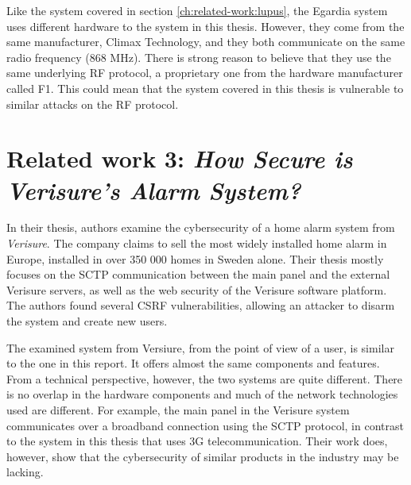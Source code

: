 Like the system covered in section \ref{ch:related-work:lupus}, the Egardia system uses different hardware to the system in this thesis. However, they come from the same manufacturer, Climax Technology, and they both communicate on the same radio frequency (868 MHz). There is strong reason to believe that they use the same underlying \gls{RF} protocol, a proprietary one from the hardware manufacturer called F1. This could mean that the system covered in this thesis is vulnerable to similar attacks on the \gls{RF} protocol.

\section{Related work 3: \textit{How Secure is Verisure’s Alarm System?}}
In their thesis, authors \citeauthor{verisurethesis} examine the cybersecurity of a home alarm system from \textit{Verisure}. The company claims to sell the most widely installed home alarm in Europe, installed in over 350 000 homes in Sweden alone. Their thesis mostly focuses on the SCTP communication between the main panel and the external Verisure servers, as well as the web security of the Verisure software platform. The authors found several \gls{CSRF} vulnerabilities, allowing an attacker to disarm the system and create new users.

The examined system from Versiure, from the point of view of a user, is similar to the one in this report. It offers almost the same components and features. From a technical perspective, however, the two systems are quite different. There is no overlap in the hardware components and much of the network technologies used are different. For example, the main panel in the Verisure system communicates over a broadband connection using the SCTP protocol, in contrast to the system in this thesis that uses 3G telecommunication. Their work does, however, show that the cybersecurity of similar products in the industry may be lacking.
